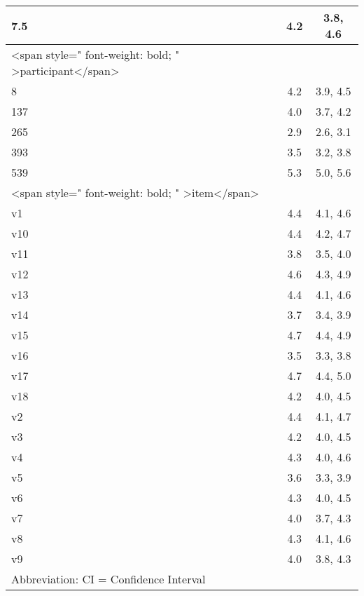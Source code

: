 \documentclass[border=1mm]{standalone}
\begin{document}
\begin{tabular}{l|c|c}
\hline
\hspace{1em}7.5 & 4.2 & 3.8, 4.6\\
\hline
<span style=" font-weight: bold;    " >participant</span> &  & \\
\hline
\hspace{1em}8 & 4.2 & 3.9, 4.5\\
\hline
\hspace{1em}137 & 4.0 & 3.7, 4.2\\
\hline
\hspace{1em}265 & 2.9 & 2.6, 3.1\\
\hline
\hspace{1em}393 & 3.5 & 3.2, 3.8\\
\hline
\hspace{1em}539 & 5.3 & 5.0, 5.6\\
\hline
<span style=" font-weight: bold;    " >item</span> &  & \\
\hline
\hspace{1em}v1 & 4.4 & 4.1, 4.6\\
\hline
\hspace{1em}v10 & 4.4 & 4.2, 4.7\\
\hline
\hspace{1em}v11 & 3.8 & 3.5, 4.0\\
\hline
\hspace{1em}v12 & 4.6 & 4.3, 4.9\\
\hline
\hspace{1em}v13 & 4.4 & 4.1, 4.6\\
\hline
\hspace{1em}v14 & 3.7 & 3.4, 3.9\\
\hline
\hspace{1em}v15 & 4.7 & 4.4, 4.9\\
\hline
\hspace{1em}v16 & 3.5 & 3.3, 3.8\\
\hline
\hspace{1em}v17 & 4.7 & 4.4, 5.0\\
\hline
\hspace{1em}v18 & 4.2 & 4.0, 4.5\\
\hline
\hspace{1em}v2 & 4.4 & 4.1, 4.7\\
\hline
\hspace{1em}v3 & 4.2 & 4.0, 4.5\\
\hline
\hspace{1em}v4 & 4.3 & 4.0, 4.6\\
\hline
\hspace{1em}v5 & 3.6 & 3.3, 3.9\\
\hline
\hspace{1em}v6 & 4.3 & 4.0, 4.5\\
\hline
\hspace{1em}v7 & 4.0 & 3.7, 4.3\\
\hline
\hspace{1em}v8 & 4.3 & 4.1, 4.6\\
\hline
\hspace{1em}v9 & 4.0 & 3.8, 4.3\\
\hline
\multicolumn{3}{l}{\rule{0pt}{1em}Abbreviation: CI = Confidence Interval}\\
\end{tabular}
\end{document}
